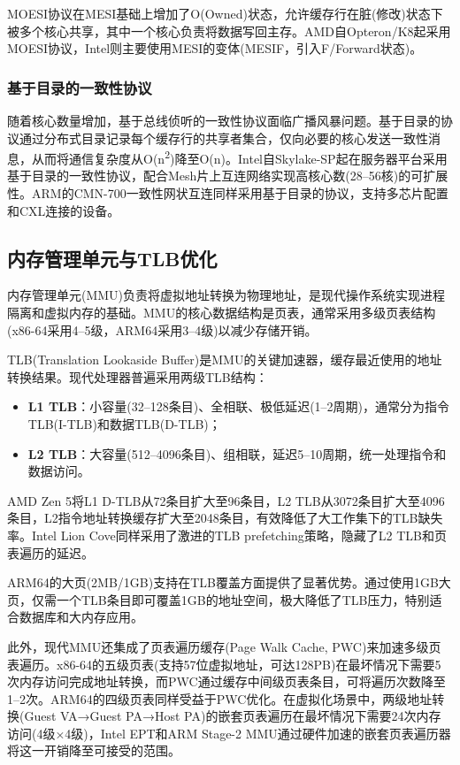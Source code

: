 \documentclass[12pt,a4paper]{IEEEtran}
\begin{document}
MOESI协议在MESI基础上增加了O(Owned)状态，允许缓存行在脏(修改)状态下被多个核心共享，其中一个核心负责将数据写回主存。AMD自Opteron/K8起采用MOESI协议，Intel则主要使用MESI的变体(MESIF，引入F/Forward状态)\cite{amd2003moesi}。

\subsubsection{基于目录的一致性协议}

随着核心数量增加，基于总线侦听的一致性协议面临广播风暴问题。基于目录的协议通过分布式目录记录每个缓存行的共享者集合，仅向必要的核心发送一致性消息，从而将通信复杂度从O(n\textsuperscript{2})降至O(n)\cite{martin2012coherence}。Intel自Skylake-SP起在服务器平台采用基于目录的一致性协议，配合Mesh片上互连网络实现高核心数(28--56核)的可扩展性。ARM的CMN-700一致性网状互连同样采用基于目录的协议，支持多芯片配置和CXL连接的设备\cite{arm2022cmn700}。

\subsection{内存管理单元与TLB优化}

内存管理单元(MMU)负责将虚拟地址转换为物理地址，是现代操作系统实现进程隔离和虚拟内存的基础。MMU的核心数据结构是页表，通常采用多级页表结构(x86-64采用4--5级，ARM64采用3--4级)以减少存储开销\cite{bhattacharjee2022mmu}。

TLB(Translation Lookaside Buffer)是MMU的关键加速器，缓存最近使用的地址转换结果。现代处理器普遍采用两级TLB结构：
\begin{itemize}
\item \textbf{L1 TLB}：小容量(32--128条目)、全相联、极低延迟(1--2周期)，通常分为指令TLB(I-TLB)和数据TLB(D-TLB)；
\item \textbf{L2 TLB}：大容量(512--4096条目)、组相联，延迟5--10周期，统一处理指令和数据访问。
\end{itemize}

AMD Zen 5将L1 D-TLB从72条目扩大至96条目，L2 TLB从3072条目扩大至4096条目，L2指令地址转换缓存扩大至2048条目，有效降低了大工作集下的TLB缺失率\cite{amd2024zen5}。Intel Lion Cove同样采用了激进的TLB prefetching策略，隐藏了L2 TLB和页表遍历的延迟。

ARM64的大页(2MB/1GB)支持在TLB覆盖方面提供了显著优势。通过使用1GB大页，仅需一个TLB条目即可覆盖1GB的地址空间，极大降低了TLB压力，特别适合数据库和大内存应用\cite{arm2022virtualization}。

此外，现代MMU还集成了页表遍历缓存(Page Walk Cache, PWC)来加速多级页表遍历。x86-64的五级页表(支持57位虚拟地址，可达128PB)在最坏情况下需要5次内存访问完成地址转换，而PWC通过缓存中间级页表条目，可将遍历次数降至1--2次。ARM64的四级页表同样受益于PWC优化。在虚拟化场景中，两级地址转换(Guest VA→Guest PA→Host PA)的嵌套页表遍历在最坏情况下需要24次内存访问(4级×4级)，Intel EPT和ARM Stage-2 MMU通过硬件加速的嵌套页表遍历器将这一开销降至可接受的范围\cite{adams2006intelvt}。
\end{document}
